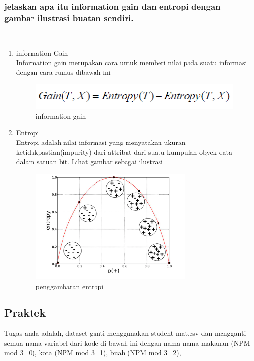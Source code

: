 \subsubsection{jelaskan apa itu information gain dan entropi dengan gambar ilustrasi buatan sendiri.}
\hfill\\
\begin{enumerate}
	\item information Gain
	\hfill\\
	Information gain merupakan cara untuk memberi nilai pada suatu informasi dengan cara rumus dibawah ini
\begin{figure}[H]
    \includegraphics[width=12cm]{figures/1174079/2/informationgainrumus.PNG}
    \centering
    \caption{information gain}
\end{figure}

	\item Entropi
	\hfill\\
	Entropi adalah nilai informasi yang menyatakan ukuran ketidakpastian(impurity) dari attribut dari suatu kumpulan obyek data dalam satuan bit. Lihat gambar sebagai ilustrasi
\begin{figure}[H]
    \includegraphics[width=8cm]{figures/1174079/2/entropy.png}
    \centering
    \caption{penggambaran entropi}
\end{figure}
\end{enumerate}



\subsection{Praktek}
Tugas anda adalah, dataset ganti menggunakan student-mat.csv dan mengganti semua nama variabel dari kode di bawah ini dengan nama-nama makanan (NPM mod 3=0), kota (NPM mod 3=1), buah (NPM mod 3=2),
 

